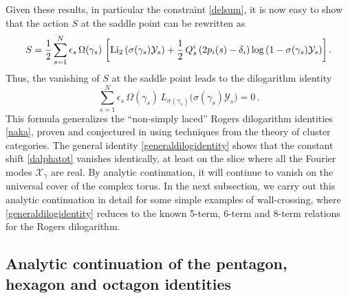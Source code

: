 \documentclass[12pt,reqno]{article}
\numberwithin{equation}{section}
\newcommand{\be}{\begin{equation}}
\newcommand{\ee}{\end{equation}}
\def\({\left(}
\def\){\right)}
\def\[{\left[}
\def\]{\right]}
\newcommand{\cX}{\mathcal{X}}
\newcommand{\cY}{\mathcal{Y}}
\numberwithin{equation}{section}
\begin{document}
Given these results, in particular the constraint \eqref{delsum},
it is now easy to show that the action $S$ at the saddle point can be rewritten as
\be
S=\frac12\sum_{s=1}^{N} \epsilon_s\, \Omega(\gamma_{s} )\,  \[
 {\rm Li_2}\left( \sigma(\gamma_{s} ) \cY_s \right)
+ \frac12\,Q^i_s\(2 p_i(s)-\delta_i\)  \log \left( 1-\sigma(\gamma_{s})  \cY_s \right) \] .
\ee
Thus, the vanishing of $S$ at the saddle point leads to  the dilogarithm identity
\be
 \sum_{s=1}^{N} \epsilon_s \, \Omega(\gamma_{s} )\,
L_{\sigma(\gamma_{s} )} \big( \sigma(\gamma_{s} ) \cY_s  \big)  = 0 \, .
\label{generaldilogidentity}
\ee
 This formula generalizes the ``non-simply laced'' Rogers dilogarithm identities \eqref{naka},
proven and conjectured in \cite{Nakanishi:2010,Keller:2010,Keller:2010b} using techniques from
the theory of cluster categories. The general identity \eqref{generaldilogidentity} shows
that the constant shift \eqref{dalphatot} vanishes identically, at least
on the slice where all the Fourier modes $\cX_\gamma$ are real. By analytic
continuation, it will continue to vanish on the universal cover of the complex
torus. In the next subsection, we carry out this analytic continuation in detail
for some simple examples of wall-crossing, where \eqref{generaldilogidentity}
reduces to the known 5-term, 6-term and 8-term relations for the Rogers dilogarithm.


\subsection{Analytic continuation of the pentagon, hexagon and octagon identities}

\label{pentagonalcontact}
\end{document}
